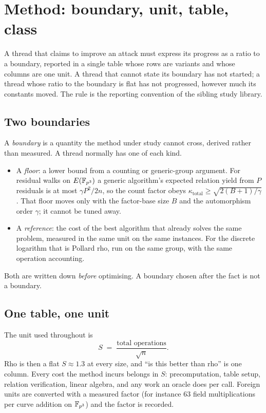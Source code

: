 \section{Method: boundary, unit, table, class}
\label{sec:method}

A thread that claims to improve an attack must express its progress as
a ratio to a boundary, reported in a single table whose rows are
variants and whose columns are one unit. A thread that cannot state
its boundary has not started; a thread whose ratio to the boundary is
flat has not progressed, however much its constants moved. The rule is
the reporting convention of the sibling study
library.

\subsection{Two boundaries}

A \emph{boundary} is a quantity the method under study cannot cross,
derived rather than measured. A thread normally has one of each kind.

\begin{itemize}[leftmargin=1.2em,itemsep=0.3em]
\item A \emph{floor}: a lower bound from a counting or generic-group
  argument. For residual walks on $E(\mathbb{F}_{p^3})$ a generic algorithm's
  expected relation yield from $P$ residuals is at most $\gamma P^2/2n$,
  so the count factor obeys $\kappa_{\mathrm{total}}\ge\sqrt{2(B+1)/\gamma}$.
  That floor moves only with the factor-base size $B$ and the
  automorphism order $\gamma$; it cannot be tuned
  away.
\item A \emph{reference}: the cost of the best algorithm that already
  solves the same problem, measured in the same unit on the same
  instances. For the discrete logarithm that is Pollard rho, run on
  the same group, with the same operation accounting.
\end{itemize}

Both are written down \emph{before} optimising. A boundary chosen after
the fact is not a boundary.

\subsection{One table, one unit}

The unit used throughout is
\[
  S \;=\; \frac{\text{total operations}}{\sqrt{n}}.
\]
Rho is then a flat $S\approx 1.3$ at every size, and ``is this better
than rho'' is one column. Every cost the method incurs belongs in $S$:
precomputation, table setup, relation verification, linear algebra,
and any work an oracle does per call. Foreign units are converted with
a measured factor (for instance $63$ field multiplications per curve
addition on $\mathbb{F}_{p^3}$) and the factor is recorded.

